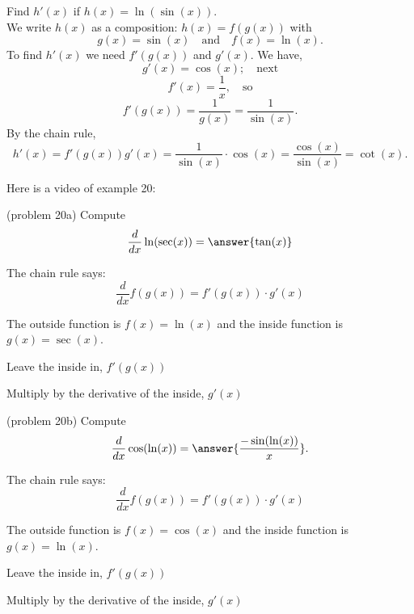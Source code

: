 \documentclass[handout]{ximera}
\begin{document}
\begin{example}[example 20]
Find $h'(x)$ if $h(x) = \ln(\sin(x))$.\\
We write $h(x)$ as a composition: $h(x)=f(g(x))$ with 
\[g(x) = \sin(x)  \quad \text{and} \quad  f(x) = \ln(x).\]
 To find $h'(x)$ we need $f'(g(x))$ and $g'(x)$.  We have,
\[g'(x) = \cos(x); \quad \text{next} \]
\[f'(x) = \frac{1}{x}, \quad \text{so}\]
\[f'(g(x)) = \frac{1}{g(x)} = \frac{1}{\sin(x)}.\]
By the chain rule,
\[h'(x) = f'(g(x))g'(x) = \frac{1}{\sin(x)} \cdot \cos(x) = \frac{\cos(x)}{\sin(x)} = \cot(x).\]
\end{example}

Here is a video of example 20:
\begin{foldable}
\end{foldable}



\begin{problem}(problem 20a)
  Compute
  \[
  \frac{d}{dx} \ln(\sec(x)) = \answer{\tan(x)}
  \]
  
    \begin{hint}
      The chain rule says:
      \[
      \frac{d}{dx} f(g(x)) = f'(g(x))\cdot g'(x)
      \]
    \end{hint}
    \begin{hint}
      The outside function is $f(x) = \ln(x)$ and the inside
      function is $g(x) = \sec(x)$.
    \end{hint}
    \begin{hint}
		  Leave the inside in, $f'(g(x))$
		\end{hint}
		\begin{hint}
		  Multiply by the derivative of the inside, $g'(x)$
		\end{hint}
    
	
\end{problem}

\begin{problem}(problem 20b)
  Compute
  \[
  \frac{d}{dx} \cos(\ln(x)) = \answer{\frac{-\sin(\ln(x))}{x}}.
  \]
  
    \begin{hint}
      The chain rule says:
      \[
      \frac{d}{dx} f(g(x)) = f'(g(x))\cdot g'(x)
      \]
    \end{hint}
    \begin{hint}
      The outside function is $f(x) = \cos(x)$ and the inside
      function is $g(x) = \ln(x)$.
    \end{hint}
    \begin{hint}
		  Leave the inside in, $f'(g(x))$
		\end{hint}
		\begin{hint}
		  Multiply by the derivative of the inside, $g'(x)$
		\end{hint}
    
		
\end{problem}
\end{document}
